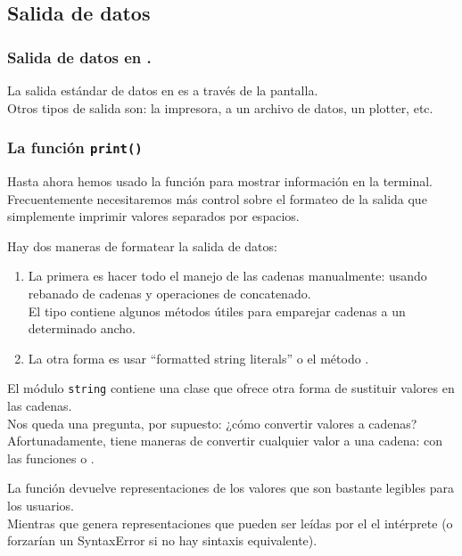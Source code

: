 \subsection{Salida de datos}
\begin{frame}
\frametitle{Salida de datos en \python.}
La salida estándar de datos en \python{} es a través de la pantalla.
\\
\bigskip
Otros tipos de salida son: la impresora, a un archivo de datos, un plotter, etc.
\end{frame}
\begin{frame}
\frametitle{La función \texttt{print()}}
Hasta ahora hemos usado la función  para mostrar información en la terminal.
\\
\bigskip
Frecuentemente necesitaremos más control sobre el formateo de la salida que simplemente imprimir valores separados por espacios.
\end{frame}
\begin{frame}
Hay dos maneras de formatear la salida de datos:
\begin{enumerate}[<+->]
\item La primera es hacer todo el manejo de las cadenas manualmente: usando rebanado de cadenas y operaciones de concatenado. 
\\
\bigskip
El tipo  contiene algunos métodos útiles para emparejar cadenas a un determinado ancho.
\item La otra forma es usar \enquote{formatted string literals} o el método .
\end{enumerate}
\end{frame}
\begin{frame}
El módulo \texttt{string} contiene una clase  que ofrece otra forma de sustituir valores en las cadenas.
\\
\bigskip
Nos queda una pregunta, por supuesto: ¿cómo convertir valores a cadenas?
\\
\bigskip
\pause
Afortunadamente, \python{} tiene maneras de convertir cualquier valor a una cadena: con las funciones  o .
\end{frame}
\begin{frame}
La función  devuelve representaciones de los valores que son bastante legibles para los usuarios.
\\
\bigskip
Mientras que  genera representaciones que pueden ser leídas por el el intérprete (o forzarían un SyntaxError si no hay sintaxis equivalente).
\end{frame}
